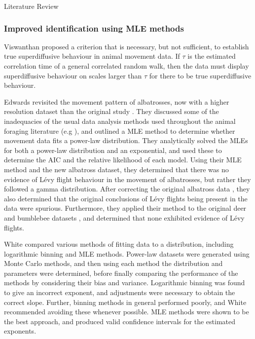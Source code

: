 \begin{section}{Literature Review \label{sec:litreview}}
\subsubsection{Improved identification using MLE methods}

Viswanthan \etal \cite{Viswanathan_2005} proposed a criterion that is necessary, but not sufficient, to establish true superdiffusive behaviour in animal movement data.
If $\tau$ is the estimated correlation time of a general correlated random walk, then the data must display superdiffusive behaviour on scales larger than $\tau$ for there to be true superdiffusive behaviour.

Edwards \etal \cite{Edwards_2007} revisited the movement pattern of albatrosses, now with a higher resolution dataset than the original study \cite{Viswanathan_1996}.
They discussed some of the inadequacies of the usual data analysis methods used throughout the animal foraging literature (e.g \cite{Cole_1995,Viswanathan_1996,Viswanathan_1999,Ayala_Orozco_2004}), and outlined a \ac{MLE} method to determine whether movement data fits a power-law distribution.
They analytically solved the \acp{MLE} for both a power-law distribution and an exponential, and used these to determine the \ac{AIC} and the relative likelihood of each model.
Using their \ac{MLE} method and the new albatross dataset, they determined that there was no evidence of L\'{e}vy flight behaviour in the movement of albatrosses, but rather they followed a gamma distribution.
After correcting the original albatross data \cite{Viswanathan_1996}, they also determined that the original conclusions of L\'{e}vy flights being present in the data were spurious.
Furthermore, they applied their method to the original deer and bumblebee datasets \cite{Viswanathan_1999}, and determined that none exhibited evidence of L\'{e}vy flights.

White \etal \cite{White_2008} compared various methods of fitting data to a distribution, including logarithmic binning and \ac{MLE} methods.
Power-law datasets were generated using Monte Carlo methods, and then using each method the distribution and parameters were determined, before finally comparing the performance of the methods by considering their bias and variance.
Logarithmic binning was found to give an incorrect exponent, and adjustments were necessary to obtain the correct slope.
Further, binning methods in general performed poorly, and White \etal \cite{White_2008} recommended avoiding these whenever possible.
\ac{MLE} methods were shown to be the best approach, and produced valid confidence intervals for the estimated exponents.


\end{section}

